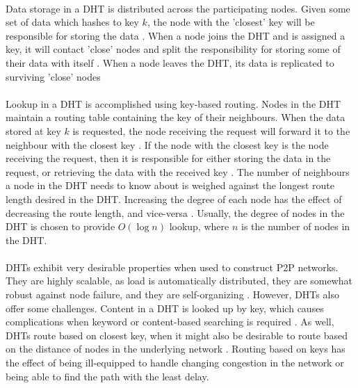 \documentclass[12pt,letterpaper]{article}
\begin{document}
\paragraph{}

Data storage in a DHT is distributed across the participating nodes.
Given some set of data which hashes to key $k$, the node with the 'closest' key will be responsible for storing the data \cite{dht-ietf}.
When a node joins the DHT and is assigned a key, it will contact 'close' nodes and split the responsibility for storing some of their data with itself \cite{dht-ietf}.
When a node leaves the DHT, its data is replicated to surviving 'close' nodes \cite{dht-ietf}

\paragraph{}

Lookup in a DHT is accomplished using key-based routing.
Nodes in the DHT maintain a routing table containing the key of their neighbours.
When the data stored at key $k$ is requested, the node receiving the request will forward it to the neighbour with the closest key \cite{dht}.
If the node with the closest key is the node receiving the request, then it is responsible for either storing the data in the request, or retrieving the data with the received key \cite{dht}.
The number of neighbours a node in the DHT needs to know about is weighed against the longest route length desired in the DHT.
Increasing the degree of each node has the effect of decreasing the route length, and vice-versa \cite{wiki-dht}.
Usually, the degree of nodes in the DHT is chosen to provide $O(\log n)$ lookup, where $n$ is the number of nodes in the DHT.

\paragraph{}

DHTs exhibit very desirable properties when used to construct P2P networks.
They are highly scalable, as load is automatically distributed, they are somewhat robust against node failure, and they are self-organizing \cite{dht-ietf}.
However, DHTs also offer some challenges.
Content in a DHT is looked up by key, which causes complications when keyword or content-based searching is required \cite{dht}\cite{dht-ietf}.
As well, DHTs route based on closest key, when it might also be desirable to route based on the distance of nodes in the underlying network \cite{dht}.
Routing based on keys has the effect of being ill-equipped to handle changing congestion in the network or being able to find the path with the least delay.
\end{document}
